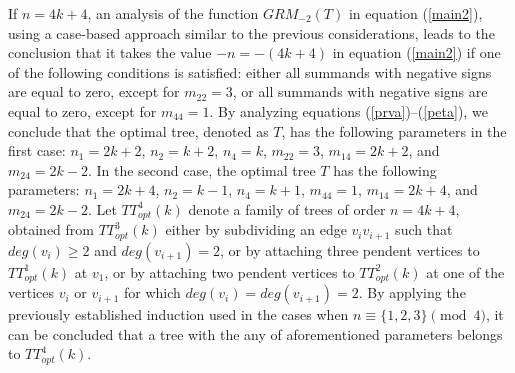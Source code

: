\documentclass[preprint,12pt]{elsarticle}
\begin{document}
\bigskip

If $n = 4k + 4$, an analysis of the function $GRM_{-2}(T)$ in equation (\ref{main2}), using a case-based approach similar to the previous considerations, leads to the conclusion that it takes the value $-n = -(4k + 4)$ in equation (\ref{main2}) if one of the following conditions is satisfied: either all summands with negative signs are equal to zero, except for $m_{22} = 3$, or all summands with negative signs are equal to zero, except for $m_{44} = 1$.
By analyzing equations (\ref{prva})–(\ref{peta}), we conclude that the optimal tree, denoted as $T$, has the following parameters in the first case: $n_1 = 2k + 2$, $n_2 = k + 2$, $n_4 = k$, $m_{22} = 3$, $m_{14} = 2k + 2$, and $m_{24} = 2k - 2$.
In the second case, the optimal tree $T$ has the following parameters: $n_1 = 2k + 4$, $n_2 = k - 1$, $n_4 = k + 1$, $m_{44} = 1$, $m_{14} = 2k + 4$, and $m_{24} = 2k - 2$.
Let $TT^4_{opt}(k)$ denote a family of trees of order $n = 4k + 4$, obtained from $TT^3_{opt}(k)$ either by subdividing an edge $v_i v_{i+1}$ such that $deg(v_i) \geq 2$ and $deg(v_{i+1}) = 2$, or by attaching three pendent vertices to $TT^1_{opt}(k)$ at $v_1$, or by attaching two pendent vertices to $TT^2_{opt}(k)$  at one of the vertices $v_i$ or $v_{i+1}$ for which $deg(v_i) = deg(v_{i+1}) = 2$.
By applying the previously established induction used in the cases when $n \equiv \{1,2,3\} \pmod{4}$, it can be concluded that a tree with the any of aforementioned parameters belongs to $TT^4_{opt}(k)$.

\bigskip




\end{document}

